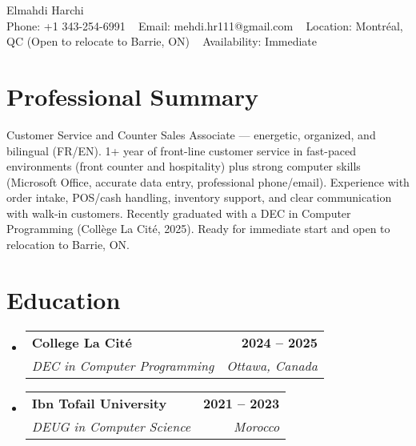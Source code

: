 \documentclass[letterpaper,11pt]{article}
\makeatletter
\newcommand{\resumeSubheading}[4]{
  \vspace{-2pt}\item
    \begin{tabular*}{1.0\textwidth}[t]{l@{\extracolsep{\fill}}r}
      \textbf{#1} & \textbf{\small #2} \\
      \textit{\small#3} & \textit{\small #4} \\
    \end{tabular*}\vspace{-7pt}
}
\newcommand{\resumeSubHeadingListStart}{\begin{itemize}[leftmargin=0.0in, label={}]}
\newcommand{\resumeSubHeadingListEnd}{\end{itemize}}\vspace{0pt}
\makeatother
\begin{document}
\begin{center}
    {\Large Elmahdi Harchi} \\[2mm]
    \footnotesize
    Phone: +1 343-254-6991 ~ 
    Email: mehdi.hr111@gmail.com ~ 
    Location: Montréal, QC (Open to relocate to Barrie, ON) ~ Availability: Immediate
    \vspace{-8pt}
\end{center}

\section{Professional Summary}
\vspace{1pt}
Customer Service and Counter Sales Associate — energetic, organized, and bilingual (FR/EN). 1+ year of front-line customer service in fast-paced environments (front counter and hospitality) plus strong computer skills (Microsoft Office, accurate data entry, professional phone/email). Experience with order intake, POS/cash handling, inventory support, and clear communication with walk-in customers. Recently graduated with a DEC in Computer Programming (Collège La Cité, 2025). Ready for immediate start and open to relocation to Barrie, ON.
\vspace{-12pt}

\section{Education}\vspace{1mm}
  \resumeSubHeadingListStart
    \resumeSubheading
      {College La Cité}{2024 -- 2025}
      {DEC in Computer Programming}{Ottawa, Canada}
    \resumeSubheading
      {Ibn Tofail University}{2021 -- 2023}
      {DEUG in Computer Science}{Morocco}
  \resumeSubHeadingListEnd
    \vspace{-12pt}
\end{document}
